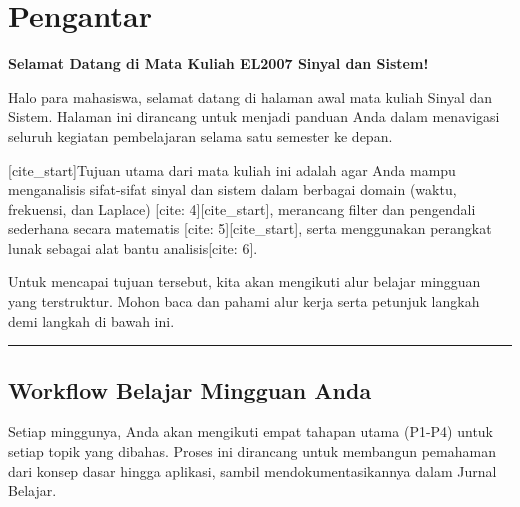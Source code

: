 \documentclass[
  letterpaper,
  DIV=11,
  numbers=noendperiod]{scrreprt}
\author{Norah Jones}
\date{2025-08-31}
\renewcommand*\contentsname{Table of contents}
\newcommand\contentsname{Table of contents}
\begin{document}
\renewcommand*\contentsname{Table of contents}
{
\hypersetup{linkcolor=}
\setcounter{tocdepth}{2}
\tableofcontents
}


\chapter*{Pengantar}\label{pengantar}


\textbf{Selamat Datang di Mata Kuliah EL2007 Sinyal dan Sistem!}

Halo para mahasiswa, selamat datang di halaman awal mata kuliah Sinyal
dan Sistem. Halaman ini dirancang untuk menjadi panduan Anda dalam
menavigasi seluruh kegiatan pembelajaran selama satu semester ke depan.

{[}cite\_start{]}Tujuan utama dari mata kuliah ini adalah agar Anda
mampu menganalisis sifat-sifat sinyal dan sistem dalam berbagai domain
(waktu, frekuensi, dan Laplace) {[}cite: 4{]}{[}cite\_start{]},
merancang filter dan pengendali sederhana secara matematis {[}cite:
5{]}{[}cite\_start{]}, serta menggunakan perangkat lunak sebagai alat
bantu analisis{[}cite: 6{]}.

Untuk mencapai tujuan tersebut, kita akan mengikuti alur belajar
mingguan yang terstruktur. Mohon baca dan pahami alur kerja serta
petunjuk langkah demi langkah di bawah ini.

\begin{center}\rule{0.5\linewidth}{0.5pt}\end{center}

\section*{\texorpdfstring{\textbf{Workflow Belajar Mingguan
Anda}}{Workflow Belajar Mingguan Anda}}\label{workflow-belajar-mingguan-anda}


Setiap minggunya, Anda akan mengikuti empat tahapan utama (P1-P4) untuk
setiap topik yang dibahas. Proses ini dirancang untuk membangun
pemahaman dari konsep dasar hingga aplikasi, sambil mendokumentasikannya
dalam Jurnal Belajar.
\end{document}
